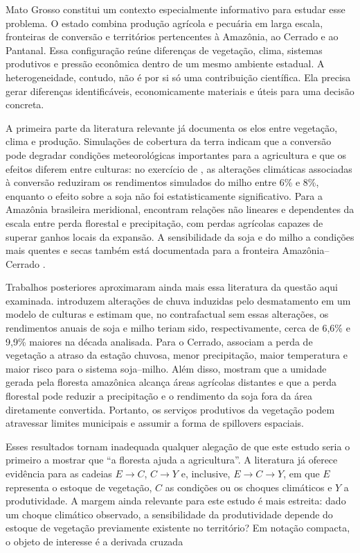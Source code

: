 Mato Grosso constitui um contexto especialmente informativo para estudar esse problema. O estado combina produção agrícola e pecuária em larga escala, fronteiras de conversão e territórios pertencentes à Amazônia, ao Cerrado e ao Pantanal. Essa configuração reúne diferenças de vegetação, clima, sistemas produtivos e pressão econômica dentro de um mesmo ambiente estadual. A heterogeneidade, contudo, não é por si só uma contribuição científica. Ela precisa gerar diferenças identificáveis, economicamente materiais e úteis para uma decisão concreta.

A primeira parte da literatura relevante já documenta os elos entre vegetação, clima e produção. Simulações de cobertura da terra indicam que a conversão pode degradar condições meteorológicas importantes para a agricultura e que os efeitos diferem entre culturas: no exercício de \cite{spera2020brazilian}, as alterações climáticas associadas à conversão reduziram os rendimentos simulados do milho entre 6\% e 8\%, enquanto o efeito sobre a soja não foi estatisticamente significativo. Para a Amazônia brasileira meridional, \cite{leitefilho2021deforestation} encontram relações não lineares e dependentes da escala entre perda florestal e precipitação, com perdas agrícolas capazes de superar ganhos locais da expansão. A sensibilidade da soja e do milho a condições mais quentes e secas também está documentada para a fronteira Amazônia--Cerrado \cite{rattis2021climatic}.

Trabalhos posteriores aproximaram ainda mais essa literatura da questão aqui examinada. \cite{batista2023deforestation} introduzem alterações de chuva induzidas pelo desmatamento em um modelo de culturas e estimam que, no contrafactual sem essas alterações, os rendimentos anuais de soja e milho teriam sido, respectivamente, cerca de 6,6\% e 9,9\% maiores na década analisada. Para o Cerrado, \cite{leitefilho2025intensification} associam a perda de vegetação a atraso da estação chuvosa, menor precipitação, maior temperatura e maior risco para o sistema soja--milho. Além disso, \cite{li2026amazon} mostram que a umidade gerada pela floresta amazônica alcança áreas agrícolas distantes e que a perda florestal pode reduzir a precipitação e o rendimento da soja fora da área diretamente convertida. Portanto, os serviços produtivos da vegetação podem atravessar limites municipais e assumir a forma de spillovers espaciais.

Esses resultados tornam inadequada qualquer alegação de que este estudo seria o primeiro a mostrar que ``a floresta ajuda a agricultura''. A literatura já oferece evidência para as cadeias $E\rightarrow C$, $C\rightarrow Y$ e, inclusive, $E\rightarrow C\rightarrow Y$, em que $E$ representa o estoque de vegetação, $C$ as condições ou os choques climáticos e $Y$ a produtividade. A margem ainda relevante para este estudo é mais estreita: dado um choque climático observado, a sensibilidade da produtividade depende do estoque de vegetação previamente existente no território? Em notação compacta, o objeto de interesse é a derivada cruzada

